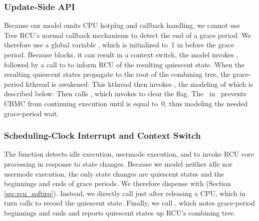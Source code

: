 \subsubsection*{Update-Side API }
Because our model omits CPU hotplug and callback handling, we cannot use
Tree RCU's normal callback mechanisms to detect the end of a grace period.
We therefore use a global variable , which is
initialized to~1 in  before the grace period.
Because  blocks, it can result in a context switch,
the model invokes , followed by a call 
to  to inform RCU of the resulting
quiescent state.
When the resulting quiescent states propagate to
the root of the combining tree, the grace-period kthread is awakened.
This kthread then invokes , the modeling of which 
is described below. Then  calls , 
which invokes  to clear the  flag.
The 
~in~  prevents CBMC from continuing execution until
 is equal to~0, thus modeling the needed grace-period
wait.

\subsubsection*{Scheduling-Clock Interrupt and Context Switch} \label{sec:model_irq}

The  function detects
idle execution, usermode execution, and to invoke RCU core processing
in response to state changes.
Because we model neither idle nor usermode execution,
the only state changes are quiescent states and the beginnings and ends of grace periods.
We therefore dispense with  (Section \ref{sec:rcu_softirq}).
Instead, we directly call  just after
releasing a CPU, which in turn calls  to record the
quiescent state.
Finally, we call ,
which notes grace-period beginnings and ends and reports quiescent states
up RCU's combining tree.

